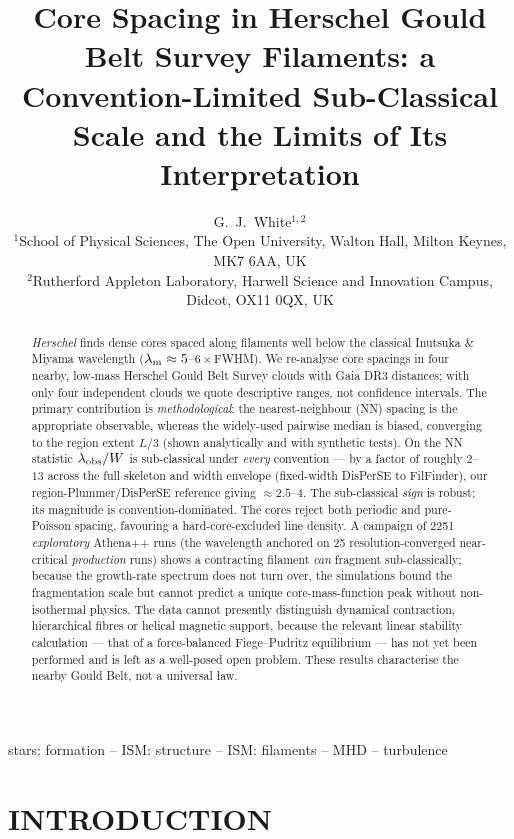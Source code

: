 \documentclass[usenatbib,twoside,twocolumn]{mnras}
\title[Sub-classical core spacing in HGBS filaments]{Core Spacing in Herschel Gould Belt Survey Filaments: a Convention-Limited Sub-Classical Scale and the Limits of Its Interpretation}
\author[G.~J.~White]{G.~J.~White$^{1,2}$\\
$^{1}$School of Physical Sciences, The Open University, Walton Hall, Milton Keynes, MK7 6AA, UK\\
$^{2}$Rutherford Appleton Laboratory, Harwell Science and Innovation Campus, Didcot, OX11 0QX, UK}
\begin{document}
\maketitle

\begin{abstract}
\textit{Herschel} finds dense cores spaced along filaments well below the classical Inutsuka \& Miyama wavelength ($\lambda_{\rm m}\approx5$--$6\times$FWHM). We re-analyse core spacings in four nearby, low-mass Herschel Gould Belt Survey clouds with Gaia DR3 distances; with only four independent clouds we quote descriptive ranges, not confidence intervals. The primary contribution is \emph{methodological}: the nearest-neighbour (NN) spacing is the appropriate observable, whereas the widely-used pairwise median is biased, converging to the region extent $L/3$ (shown analytically and with synthetic tests). On the NN statistic $\lambda_{\rm obs}/W$ is sub-classical under \emph{every} convention --- by a factor of roughly $2$--$13$ across the full skeleton and width envelope (fixed-width DisPerSE to FilFinder), our region-Plummer/DisPerSE reference giving $\approx2.5$--$4$. The sub-classical \emph{sign} is robust; its magnitude is convention-dominated. The cores reject both periodic and pure-Poisson spacing, favouring a hard-core-excluded line density. A campaign of 2251 \emph{exploratory} Athena++ runs (the wavelength anchored on 25 resolution-converged near-critical \emph{production} runs) shows a contracting filament \emph{can} fragment sub-classically; because the growth-rate spectrum does not turn over, the simulations bound the fragmentation scale but cannot predict a unique core-mass-function peak without non-isothermal physics. The data cannot presently distinguish dynamical contraction, hierarchical fibres or helical magnetic support, because the relevant linear stability calculation --- that of a force-balanced Fiege--Pudritz equilibrium --- has not yet been performed and is left as a well-posed open problem. These results characterise the nearby Gould Belt, not a universal law.
\end{abstract}


\begin{keywords}
stars: formation -- ISM: structure -- ISM: filaments -- MHD -- turbulence
\end{keywords}

\section{INTRODUCTION}
\end{document}

